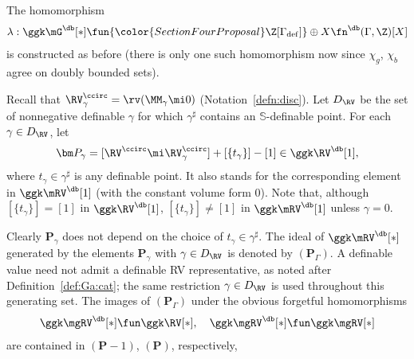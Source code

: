 \begin{nota}\label{db:gam:fn}
The homomorphism
\begin{equation*}
\lambda : \ggk \mG^{\db}[*] \fun {\color{SectionFourProposal}\Z[\Gamma_{\mathrm{def}}]} \oplus X \fn^{\db}(\Gamma, \Z)[X]
\end{equation*}
is constructed as before (there is only one such homomorphism now since  $\chi_{g}$, $\chi_{b}$ agree on doubly bounded sets).
\end{nota}


\begin{nota}\label{pgammabis}
Recall that $\RV^{\ccirc}_\gamma = \rv(\MM_{\gamma} \mi 0)$ (Notation~\ref{defn:disc}). {\color{SectionFourProposal}Let $D_{\RV}$ be the set of nonnegative definable $\gamma$ for which $\gamma^\sharp$ contains an $\mathbb S$-definable point. For each $\gamma\in D_{\RV}$, let}
\[
\bm P_\gamma = [\RV^{\ccirc} \mi \RV^{\ccirc}_{\gamma}] + [\{t_\gamma\}] - [1] \in \ggk \RV^{\db}[1],
\]
where $t_\gamma \in \gamma^\sharp$ is any definable point.  It also stands for the corresponding element  in $\ggk \mRV^{\db}[1]$ (with the constant volume form $0$). Note that, although $[\{t_\gamma\}] = [1]$ in $\ggk \RV^{\db}[1]$,  $[\{t_\gamma\}] \neq [1]$ in $\ggk \mRV^{\db}[1]$  unless $\gamma = 0$.


Clearly  $\bm P_\gamma$ does not depend on the choice of $t_\gamma \in \gamma^\sharp$. The ideal of $\ggk \mRV^{\db}[*]$   generated by the elements $\bm P_\gamma$ {\color{SectionFourProposal}with $\gamma\in D_{\RV}$} is denoted by $(\bm P_\Gamma)$. {\color{SectionFourProposal}A definable value need not admit a definable RV representative, as noted after Definition~\ref{def:Ga:cat}; the same restriction $\gamma\in D_{\RV}$ is used throughout this generating set.} The images of $(\bm P_\Gamma)$ under the obvious forgetful homomorphisms
\[
\ggk  \mgRV^{\db}[*] \fun \ggk \RV[*], \quad \ggk  \mgRV^{\db}[*] \fun \ggk  \mgRV[*]
\]
are contained in $(\bm P - 1)$, $(\bm P)$, respectively,

\end{nota}

